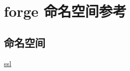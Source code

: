 \hypertarget{namespaceforge}{}\section{forge 命名空间参考}
\label{namespaceforge}
\subsection*{命名空间}
\begin{DoxyCompactItemize}
\item 
 \mbox{\hyperlink{namespaceforge_1_1ssl}{ssl}}
\end{DoxyCompactItemize}
